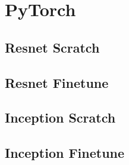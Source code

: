 \newpage



\section{PyTorch}

\subsection{Resnet Scratch}
\begin{figure}[H]

\end{figure}

\subsection{Resnet Finetune}
\begin{figure}[H]

\end{figure}

\newpage

\subsection{Inception Scratch}
\begin{figure}[H]

\end{figure}
\subsection{Inception Finetune}
\begin{figure}[H]

\end{figure}


